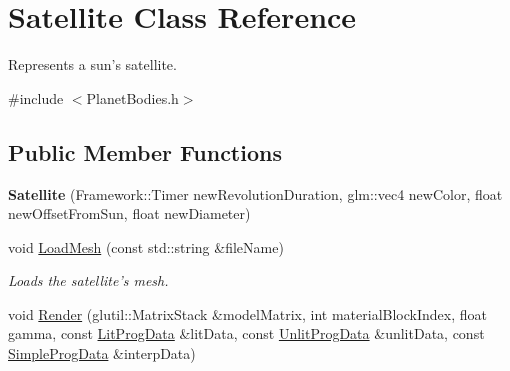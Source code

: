 \hypertarget{class_satellite}{\section{Satellite Class Reference}
\label{class_satellite}
}


Represents a sun's satellite.  




{\ttfamily \#include $<$Planet\-Bodies.\-h$>$}

\subsection*{Public Member Functions}
\begin{DoxyCompactItemize}
\item 
\hypertarget{class_satellite_a0815f2dee51926f4d505275326b1fc21}{{\bfseries Satellite} (Framework\-::\-Timer new\-Revolution\-Duration, glm\-::vec4 new\-Color, float new\-Offset\-From\-Sun, float new\-Diameter)}\label{class_satellite_a0815f2dee51926f4d505275326b1fc21}

\item 
\hypertarget{class_satellite_a810947406b5df21450b07a6f9250d83e}{void \hyperlink{class_satellite_a810947406b5df21450b07a6f9250d83e}{Load\-Mesh} (const std\-::string \&file\-Name)}\label{class_satellite_a810947406b5df21450b07a6f9250d83e}

\begin{DoxyCompactList}\small\item\em Loads the satellite's mesh. \end{DoxyCompactList}\item 
\hypertarget{class_satellite_a6c61708e6a955d1676dfb2f779cf0698}{void \hyperlink{class_satellite_a6c61708e6a955d1676dfb2f779cf0698}{Render} (glutil\-::\-Matrix\-Stack \&model\-Matrix, int material\-Block\-Index, float gamma, const \hyperlink{struct_lit_prog_data}{Lit\-Prog\-Data} \&lit\-Data, const \hyperlink{struct_unlit_prog_data}{Unlit\-Prog\-Data} \&unlit\-Data, const \hyperlink{struct_simple_prog_data}{Simple\-Prog\-Data} \&interp\-Data)}\label{class_satellite_a6c61708e6a955d1676dfb2f779cf0698}


\end{DoxyCompactItemize}
